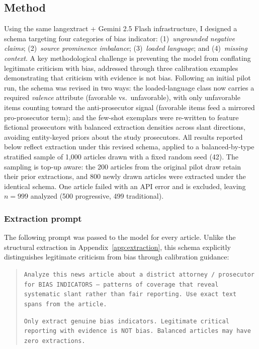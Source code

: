 \documentclass[12pt, letterpaper]{article}
\begin{document}
\begin{appendices}
\subsection*{Method}

Using the same langextract + Gemini 2.5 Flash infrastructure, I designed a schema targeting four categories of bias indicator: (1)~\emph{ungrounded negative claims}; (2)~\emph{source prominence imbalance}; (3)~\emph{loaded language}; and (4)~\emph{missing context}. A key methodological challenge is preventing the model from conflating legitimate criticism with bias, addressed through three calibration examples demonstrating that criticism with evidence is not bias. Following an initial pilot run, the schema was revised in two ways: the loaded-language class now carries a required \emph{valence} attribute (favorable vs.\ unfavorable), with only unfavorable items counting toward the anti-prosecutor signal (favorable items feed a mirrored pro-prosecutor term); and the few-shot exemplars were re-written to feature fictional prosecutors with balanced extraction densities across slant directions, avoiding entity-keyed priors about the study prosecutors. All results reported below reflect extraction under this revised schema, applied to a balanced-by-type stratified sample of 1{,}000 articles drawn with a fixed random seed (42). The sampling is top-up aware: the 200 articles from the original pilot draw retain their prior extractions, and 800 newly drawn articles were extracted under the identical schema. One article failed with an API error and is excluded, leaving $n = 999$ analyzed (500 progressive, 499 traditional).

\subsubsection*{Extraction prompt}

The following prompt was passed to the model for every article. Unlike the structural extraction in Appendix~\ref{app:extraction}, this schema explicitly distinguishes legitimate criticism from bias through calibration guidance:

\begin{quote}
\small
\texttt{Analyze this news article about a district attorney / prosecutor for BIAS INDICATORS --- patterns of coverage that reveal systematic slant rather than fair reporting. Use exact text spans from the article.}

\texttt{Only extract genuine bias indicators. Legitimate critical reporting with evidence is NOT bias. Balanced articles may have zero extractions.}


\end{quote}
\end{appendices}
\end{document}
